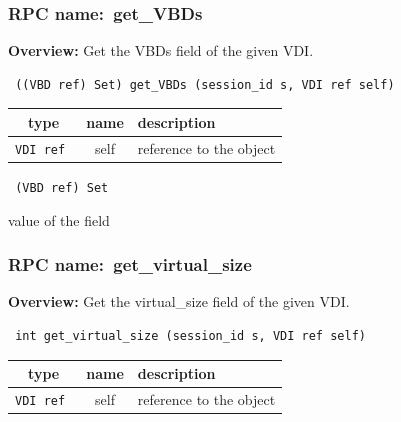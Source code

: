 \vspace{0.3cm}
\vspace{0.3cm}
\vspace{0.3cm}
\subsubsection{RPC name:~get\_VBDs}

{\bf Overview:} 
Get the VBDs field of the given VDI.

\begin{verbatim} ((VBD ref) Set) get_VBDs (session_id s, VDI ref self)\end{verbatim}



 
\vspace{0.3cm}
\begin{tabular}{|c|c|p{7cm}|}
 \hline
{\bf type} & {\bf name} & {\bf description} \\ \hline
{\tt VDI ref } & self & reference to the object \\ \hline 

\end{tabular}

\vspace{0.3cm}

{\tt 
(VBD ref) Set
}


value of the field
\vspace{0.3cm}
\vspace{0.3cm}
\vspace{0.3cm}
\subsubsection{RPC name:~get\_virtual\_size}

{\bf Overview:} 
Get the virtual\_size field of the given VDI.

\begin{verbatim} int get_virtual_size (session_id s, VDI ref self)\end{verbatim}



 
\vspace{0.3cm}
\begin{tabular}{|c|c|p{7cm}|}
 \hline
{\bf type} & {\bf name} & {\bf description} \\ \hline
{\tt VDI ref } & self & reference to the object \\ \hline 

\end{tabular}

